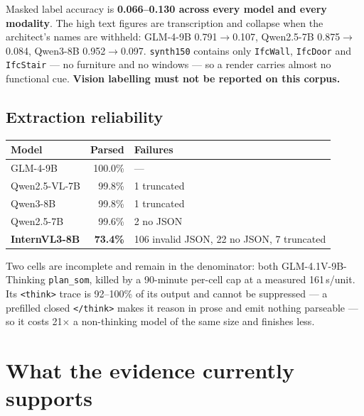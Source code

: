 \documentclass[11pt,a4paper]{article}
\newcommand{\code}[1]{\texttt{\small #1}}
\begin{document}
Masked label accuracy is \textbf{0.066--0.130 across every model and every
modality}. The high text figures are transcription and collapse when the
architect's names are withheld: GLM-4-9B 0.791$\to$0.107, Qwen2.5-7B
0.875$\to$0.084, Qwen3-8B 0.952$\to$0.097. \code{synth150} contains only
\code{IfcWall}, \code{IfcDoor} and \code{IfcStair} --- no furniture and no
windows --- so a render carries almost no functional cue. \textbf{Vision
labelling must not be reported on this corpus.}

\subsection{Extraction reliability}

\begin{table}[ht]
\centering
\small
\begin{tabular}{lrl}
\toprule
Model & Parsed & Failures \\
\midrule
GLM-4-9B       & 100.0\% & --- \\
Qwen2.5-VL-7B  & 99.8\%  & 1 truncated \\
Qwen3-8B       & 99.8\%  & 1 truncated \\
Qwen2.5-7B     & 99.6\%  & 2 no JSON \\
\textbf{InternVL3-8B} & \textbf{73.4\%} & 106 invalid JSON, 22 no JSON, 7 truncated \\
\bottomrule
\end{tabular}
\end{table}

\noindent
Two cells are incomplete and remain in the denominator: both
GLM-4.1V-9B-Thinking \code{plan\_som}, killed by a 90-minute per-cell cap at a
measured 161\,s/unit. Its \code{<think>} trace is 92--100\% of its output and
cannot be suppressed --- a prefilled closed \code{</think>} makes it reason in
prose and emit nothing parseable --- so it costs 21$\times$ a non-thinking
model of the same size and finishes less.

\section{What the evidence currently supports}
\end{document}
